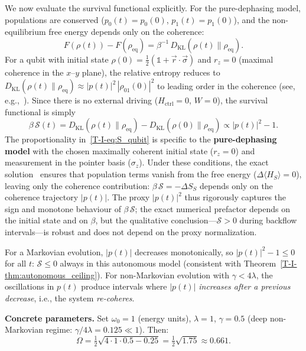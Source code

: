 \documentclass[12pt,a4paper,openany]{book}
\begin{document}
We now evaluate the survival functional explicitly.
For the pure-dephasing model, populations are conserved
($p_0(t) = p_0(0)$, $p_1(t) = p_1(0)$), and the non-equilibrium
free energy depends only on the coherence:
\begin{equation}
\label{T-I-eq:F_qubit}
F(\rho(t)) - F(\rho_{\mathrm{eq}})
= \beta^{-1}\, D_{\mathrm{KL}}(\rho(t) \| \rho_{\mathrm{eq}}).
\end{equation}
For a qubit with initial state
$\rho(0) = \tfrac{1}{2}(\mathbb{1} + \vec{r}\cdot\vec{\sigma})$
and $r_z = 0$ (maximal coherence in the $x$--$y$ plane),
the relative entropy reduces to
$D_{\mathrm{KL}}(\rho(t) \| \rho_{\mathrm{eq}})
\approx |p(t)|^2\, |\rho_{01}(0)|^2$
to leading order in the coherence (see,
e.g.,~\cite{BreuerPetruccione2002}).
Since there is no external driving ($H_{\mathrm{ctrl}} = 0$,
$W = 0$), the survival functional is simply
\begin{equation}
\label{T-I-eq:S_qubit}
\beta\,\mathcal{S}(t)
= D_{\mathrm{KL}}(\rho(t) \| \rho_{\mathrm{eq}})
  - D_{\mathrm{KL}}(\rho(0) \| \rho_{\mathrm{eq}})
\propto |p(t)|^2 - 1.
\end{equation}
The proportionality in~\eqref{T-I-eq:S_qubit} is specific to
the \textbf{pure-dephasing model} with the chosen maximally
coherent initial state ($r_z = 0$) and measurement in the
pointer basis ($\sigma_z$).
Under these conditions, the exact
solution~\cite{BreuerPetruccione2002} ensures that population
terms vanish from the free energy
($\Delta\langle H_S \rangle = 0$), leaving only the
coherence contribution:
$\beta\,\mathcal{S} = -\Delta S_S$ depends only on the
coherence trajectory $|p(t)|$.
The proxy $|p(t)|^2$ thus rigorously captures the sign and
monotone behaviour of $\beta\,\mathcal{S}$; the exact
numerical prefactor depends on the initial state and
on $\beta$, but the qualitative conclusion---$\mathcal{S} > 0$
during backflow intervals---is robust and does not depend on
the proxy normalization.

For a Markovian evolution, $|p(t)|$ decreases monotonically,
so $|p(t)|^2 - 1 \leq 0$ for all $t$: $\mathcal{S} \leq 0$
always in this autonomous model (consistent with
Theorem~\ref{T-I-thm:autonomous_ceiling}).
For non-Markovian evolution with $\gamma < 4\lambda$, the
oscillations in $p(t)$ produce intervals where $|p(t)|$
\emph{increases after a previous decrease}, i.e., the system
\emph{re-coheres}.

\textbf{Concrete parameters.}
Set $\omega_0 = 1$ (energy units), $\lambda = 1$,
$\gamma = 0.5$ (deep non-Markovian regime: $\gamma / 4\lambda = 0.125 \ll 1$).
Then:
\begin{equation}
\Omega = \tfrac{1}{2}\sqrt{4 \cdot 1 \cdot 0.5 - 0.25}
= \tfrac{1}{2}\sqrt{1.75} \approx 0.661.
\end{equation}
\end{document}
